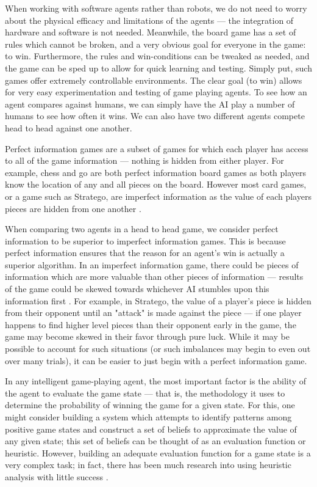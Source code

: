 When working with software agents rather than robots, we do not need to worry about the physical efficacy and limitations of the agents --- the integration of hardware and software is not needed.  Meanwhile, the board game has a set of rules which cannot be broken, and a very obvious goal for everyone in the game: to win.  Furthermore, the rules and win-conditions can be tweaked as needed, and the game can be sped up to allow for quick learning and testing.  Simply put, such games offer extremely controllable environments.  The clear goal (to win) allows for very easy experimentation and testing of game playing agents.  To see how an agent compares against humans, we can simply have the AI play a number of humans to see how often it wins.  We can also have two different agents compete head to head against one another.

Perfect information games are a subset of games for which each player has access to all of the game information --- nothing is hidden from either player.  For example, chess and go are both perfect information board games as both players know the location of any and all pieces on the board.  However most card games, or a game such as Stratego, are imperfect information as the value of each players pieces are hidden from one another \cite{Policonomics}.

When comparing two agents in a head to head game, we consider perfect information to be superior to imperfect information games.  This is because perfect information ensures that the reason for an agent's win is actually a superior algorithm.  In an imperfect information game, there could be pieces of information which are more valuable than other pieces of information --- results of the game could be skewed towards whichever AI stumbles upon this information first \cite{Gilpin}.  For example, in Stratego, the value of a player's piece is hidden from their opponent until an "attack" is made against the piece --- if one player happens to find higher level pieces than their opponent early in the game, the game may become skewed in their favor through pure luck.  While it may be possible to account for such situations (or such imbalances may begin to even out over many trials), it can be easier to just begin with a perfect information game.

In any intelligent game-playing agent, the most important factor is the ability of the agent to evaluate the game state --- that is, the methodology it uses to determine the probability of winning the game for a given state.  For this, one might consider building a system which attempts to identify patterns among positive game states and construct a set of beliefs to approximate the value of any given state; this set of beliefs can be thought of as an evaluation function or heuristic.  However, building an adequate evaluation function for a game state is a very complex task; in fact, there has been much research into using heuristic analysis with little success \cite{chaslot2008monte}.

